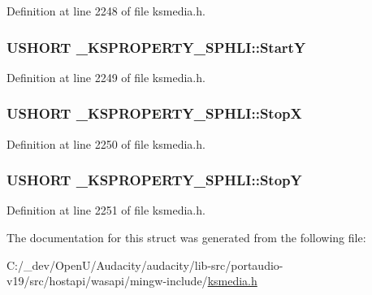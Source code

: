 Definition at line 2248 of file ksmedia.\+h.

\subsubsection[{\texorpdfstring{StartY}{StartY}}]{\setlength{\rightskip}{0pt plus 5cm}U\+S\+H\+O\+RT \+\_\+\+K\+S\+P\+R\+O\+P\+E\+R\+T\+Y\+\_\+\+S\+P\+H\+L\+I\+::\+StartY}\hypertarget{struct___k_s_p_r_o_p_e_r_t_y___s_p_h_l_i_add8a3cf7875c56e75fad508fbeb1e60d}{}\label{struct___k_s_p_r_o_p_e_r_t_y___s_p_h_l_i_add8a3cf7875c56e75fad508fbeb1e60d}


Definition at line 2249 of file ksmedia.\+h.

\subsubsection[{\texorpdfstring{StopX}{StopX}}]{\setlength{\rightskip}{0pt plus 5cm}U\+S\+H\+O\+RT \+\_\+\+K\+S\+P\+R\+O\+P\+E\+R\+T\+Y\+\_\+\+S\+P\+H\+L\+I\+::\+StopX}\hypertarget{struct___k_s_p_r_o_p_e_r_t_y___s_p_h_l_i_a93787865f048824d9d2626930d26ba49}{}\label{struct___k_s_p_r_o_p_e_r_t_y___s_p_h_l_i_a93787865f048824d9d2626930d26ba49}


Definition at line 2250 of file ksmedia.\+h.

\subsubsection[{\texorpdfstring{StopY}{StopY}}]{\setlength{\rightskip}{0pt plus 5cm}U\+S\+H\+O\+RT \+\_\+\+K\+S\+P\+R\+O\+P\+E\+R\+T\+Y\+\_\+\+S\+P\+H\+L\+I\+::\+StopY}\hypertarget{struct___k_s_p_r_o_p_e_r_t_y___s_p_h_l_i_a76a56f278a7eed4a44fb2764b231bdbf}{}\label{struct___k_s_p_r_o_p_e_r_t_y___s_p_h_l_i_a76a56f278a7eed4a44fb2764b231bdbf}


Definition at line 2251 of file ksmedia.\+h.



The documentation for this struct was generated from the following file\+:\begin{DoxyCompactItemize}
\item 
C\+:/\+\_\+dev/\+Open\+U/\+Audacity/audacity/lib-\/src/portaudio-\/v19/src/hostapi/wasapi/mingw-\/include/\hyperlink{ksmedia_8h}{ksmedia.\+h}\end{DoxyCompactItemize}
